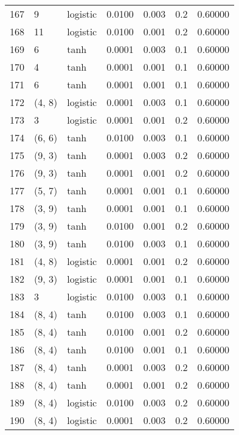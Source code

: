 \begin{tabular}{lllrrrr}
167 &           9 &  logistic &  0.0100 &  0.003 &  0.2 &   0.60000 \\
168 &          11 &  logistic &  0.0100 &  0.001 &  0.2 &   0.60000 \\
169 &           6 &      tanh &  0.0001 &  0.003 &  0.1 &   0.60000 \\
170 &           4 &      tanh &  0.0001 &  0.001 &  0.1 &   0.60000 \\
171 &           6 &      tanh &  0.0001 &  0.001 &  0.1 &   0.60000 \\
172 &      (4, 8) &  logistic &  0.0001 &  0.003 &  0.1 &   0.60000 \\
173 &           3 &  logistic &  0.0001 &  0.001 &  0.2 &   0.60000 \\
174 &      (6, 6) &      tanh &  0.0100 &  0.003 &  0.1 &   0.60000 \\
175 &      (9, 3) &      tanh &  0.0001 &  0.003 &  0.2 &   0.60000 \\
176 &      (9, 3) &      tanh &  0.0001 &  0.001 &  0.2 &   0.60000 \\
177 &      (5, 7) &      tanh &  0.0001 &  0.001 &  0.1 &   0.60000 \\
178 &      (3, 9) &      tanh &  0.0001 &  0.001 &  0.1 &   0.60000 \\
179 &      (3, 9) &      tanh &  0.0100 &  0.001 &  0.2 &   0.60000 \\
180 &      (3, 9) &      tanh &  0.0100 &  0.003 &  0.1 &   0.60000 \\
181 &      (4, 8) &  logistic &  0.0001 &  0.001 &  0.2 &   0.60000 \\
182 &      (9, 3) &  logistic &  0.0001 &  0.001 &  0.1 &   0.60000 \\
183 &           3 &  logistic &  0.0100 &  0.003 &  0.1 &   0.60000 \\
184 &      (8, 4) &      tanh &  0.0100 &  0.003 &  0.1 &   0.60000 \\
185 &      (8, 4) &      tanh &  0.0100 &  0.001 &  0.2 &   0.60000 \\
186 &      (8, 4) &      tanh &  0.0100 &  0.001 &  0.1 &   0.60000 \\
187 &      (8, 4) &      tanh &  0.0001 &  0.003 &  0.2 &   0.60000 \\
188 &      (8, 4) &      tanh &  0.0001 &  0.001 &  0.2 &   0.60000 \\
189 &      (8, 4) &  logistic &  0.0100 &  0.003 &  0.2 &   0.60000 \\
190 &      (8, 4) &  logistic &  0.0001 &  0.003 &  0.2 &   0.60000 \\

\end{tabular}
